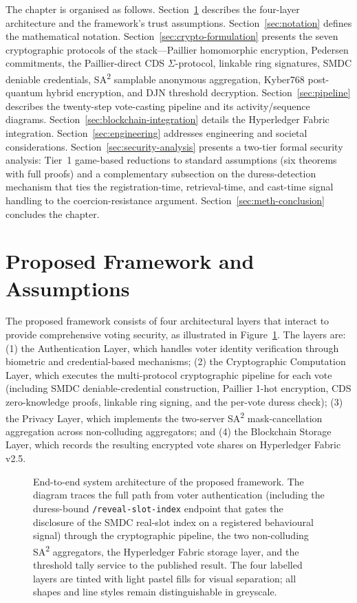 The chapter is organised as follows. Section~\ref{sec:framework} describes the four-layer architecture and the framework's trust assumptions. Section~\ref{sec:notation} defines the mathematical notation. Section~\ref{sec:crypto-formulation} presents the seven cryptographic protocols of the stack---Paillier homomorphic encryption, Pedersen commitments, the Paillier-direct CDS $\Sigma$-protocol, linkable ring signatures, SMDC deniable credentials, SA\textsuperscript{2} samplable anonymous aggregation, Kyber768 post-quantum hybrid encryption, and DJN threshold decryption. Section~\ref{sec:pipeline} describes the twenty-step vote-casting pipeline and its activity/sequence diagrams. Section~\ref{sec:blockchain-integration} details the Hyperledger Fabric integration. Section~\ref{sec:engineering} addresses engineering and societal considerations. Section~\ref{sec:security-analysis} presents a two-tier formal security analysis: Tier~1 game-based reductions to standard assumptions (six theorems with full proofs) and a complementary subsection on the duress-detection mechanism that ties the registration-time, retrieval-time, and cast-time signal handling to the coercion-resistance argument. Section~\ref{sec:meth-conclusion} concludes the chapter.

\section{Proposed Framework and Assumptions}
\label{sec:framework}

The proposed framework consists of four architectural layers that interact to provide comprehensive voting security, as illustrated in Figure~\ref{fig:architecture}. The layers are: (1) the Authentication Layer, which handles voter identity verification through biometric and credential-based mechanisms; (2) the Cryptographic Computation Layer, which executes the multi-protocol cryptographic pipeline for each vote (including SMDC deniable-credential construction, Paillier 1-hot encryption, CDS zero-knowledge proofs, linkable ring signing, and the per-vote duress check); (3) the Privacy Layer, which implements the two-server SA\textsuperscript{2} mask-cancellation aggregation across non-colluding aggregators; and (4) the Blockchain Storage Layer, which records the resulting encrypted vote shares on Hyperledger Fabric v2.5.

\begin{figure}[H]
\centering
\resizebox{\textwidth}{!}{}
\caption[Proposed System Architecture Overview]{End-to-end system architecture of the proposed framework. The diagram traces the full path from voter authentication (including the duress-bound \texttt{/reveal-slot-index} endpoint that gates the disclosure of the SMDC real-slot index on a registered behavioural signal) through the cryptographic pipeline, the two non-colluding SA\textsuperscript{2} aggregators, the Hyperledger Fabric storage layer, and the threshold tally service to the published result. The four labelled layers are tinted with light pastel fills for visual separation; all shapes and line styles remain distinguishable in greyscale.}
\label{fig:architecture}
\end{figure}


